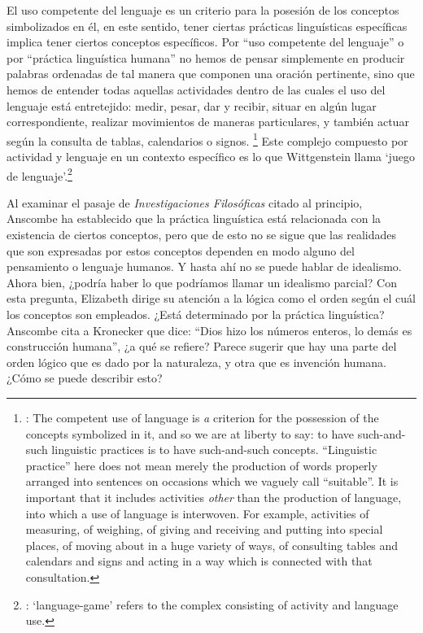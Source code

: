 El uso competente del lenguaje es un criterio para la posesión de los conceptos simbolizados en él, en este sentido, tener ciertas prácticas linguísticas específicas implica tener ciertos conceptos específicos. Por \enquote{uso competente del lenguaje} o por \enquote{práctica linguística humana} no hemos de pensar simplemente en producir palabras ordenadas de tal manera que componen una oración pertinente, sino que hemos de entender todas aquellas actividades dentro de las cuales el uso del lenguaje está entretejido: medir, pesar, dar y recibir, situar en algún lugar correspondiente, realizar movimientos de maneras particulares, y también actuar según la consulta de tablas, calendarios o signos. \footnote{\cite[Cf.~][117]{anscombe1981parmenides:qli}: The competent use of language is \emph{a} criterion for the possession of the concepts symbolized in it, and so we are at liberty to say: to have such-and-such linguistic practices is to have such-and-such concepts. ``Linguistic practice'' here does not mean merely the production of words properly arranged into sentences on occasions which we vaguely call ``suitable''. It is important that it includes activities \emph{other} than the production of language, into which a use of language is interwoven. For example, activities of measuring, of weighing, of giving and receiving and putting into special places, of moving about in a huge variety of ways, of consulting tables and calendars and signs and acting in a way which is connected with that consultation.} Este complejo compuesto por actividad y lenguaje en un contexto específico es lo que Wittgenstein llama `juego de lenguaje'.\footnote{\cite[Cf.~][62]{bakerhacker2009understanding}: `language-game' refers to the complex consisting of activity and language use.}

Al examinar el pasaje de \emph{Investigaciones Filosóficas} citado al principio, Anscombe ha establecido que la práctica linguística está relacionada con la existencia de ciertos conceptos, pero que de esto no se sigue que las realidades que son expresadas por estos conceptos dependen en modo alguno del pensamiento o lenguaje humanos. Y hasta ahí no se puede hablar de idealismo. Ahora bien, ¿podría haber lo que podríamos llamar un idealismo parcial? Con esta pregunta, Elizabeth dirige su atención a la lógica como el orden según el cuál los conceptos son empleados. ¿Está determinado por la práctica linguística? Anscombe cita a Kronecker que dice: ``Dios hizo los números enteros, lo demás es construcción humana'', ¿a qué se refiere? Parece sugerir que hay una parte del orden lógico que es dado por la naturaleza, y otra que es invención humana. ¿Cómo se puede describir esto?

